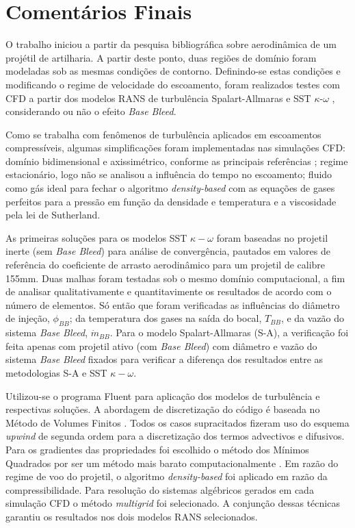 \chapter{Comentários Finais}\label{cap:conclusoes}

O trabalho iniciou a partir da pesquisa bibliográfica sobre aerodinâmica de um projétil de artilharia. A partir deste ponto, duas regiões de domínio foram modeladas sob as mesmas condições de contorno. Definindo-se estas condições e modificando o regime de velocidade do escoamento, foram realizados testes com CFD a partir dos modelos RANS de turbulência Spalart-Allmaras \cite{Spalart1992} e SST $\kappa$-$\omega$ \cite{Menter1994TwoequationET,Menter2003,Menter2009}, considerando ou não o efeito \textit{Base Bleed}.

Como se trabalha com fenômenos de turbulência aplicados em escoamentos compressíveis, algumas simplificações foram implementadas nas simulações CFD: domínio bidimensional e axissimétrico, conforme as principais referências \cite{Mahmoud2009,Lucena2020}; regime estacionário, logo não se analisou a influência do tempo no escoamento; fluido como gás ideal para fechar o algoritmo \textit{density-based} com as equações de gases perfeitos para a pressão em função da densidade e temperatura e a viscosidade pela lei de Sutherland.

As primeiras soluções para os modelos SST $\kappa-\omega$ foram baseadas no projetil inerte (sem \textit{Base Bleed}) para análise de convergência, pautados em valores de referência \cite{Mahmoud2009} do coeficiente de arrasto aerodinâmico para um projetil de calibre 155mm. Duas malhas foram testadas sob o mesmo domínio computacional, a fim de analisar qualitativamente e quantitavimente os resultados de acordo com o número de elementos. Só então que foram verificadas as influências do diâmetro de injeção, \(\phi_{BB}\); da temperatura dos gases na saída do bocal, \(T_{BB}\), e da vazão do sistema \textit{Base Bleed}, \(\Dot{m}_{BB}\). Para o modelo Spalart-Allmaras (S-A), a verificação foi feita apenas com projetil ativo (com \textit{Base Bleed}) com diâmetro e vazão do sistema \textit{Base Bleed} fixados para verificar a diferença dos resultados entre as metodologias S-A e SST $\kappa-\omega$.

Utilizou-se o programa Fluent \cite{fluent2021ansys} para aplicação dos modelos de turbulência e respectivas soluções. A abordagem de discretização do código é baseada no Método de Volumes Finitos \cite{McDonald1971,MacComarck&Paulay1972}. Todos os casos supracitados fizeram uso do esquema \textit{upwind} de segunda ordem para a discretização dos termos advectivos e difusivos. Para os gradientes das propriedades foi escolhido o método dos Mínimos Quadrados por ser um método mais barato computacionalmente \cite{fluent2021ansys}. Em razão do regime de voo do projetil, o algoritmo \textit{density-based} \cite{Weiss1995PreconditioningAT,Weiss1997IMPLICITSO,Weiss1999ImplicitSO} foi aplicado em razão da compressibilidade. Para resolução do sistemas algébricos gerados em cada simulação CFD o método \textit{multigrid} \cite{Hutchinson1986} foi selecionado. A conjunção dessas técnicas garantiu os resultados nos dois modelos RANS selecionados.

